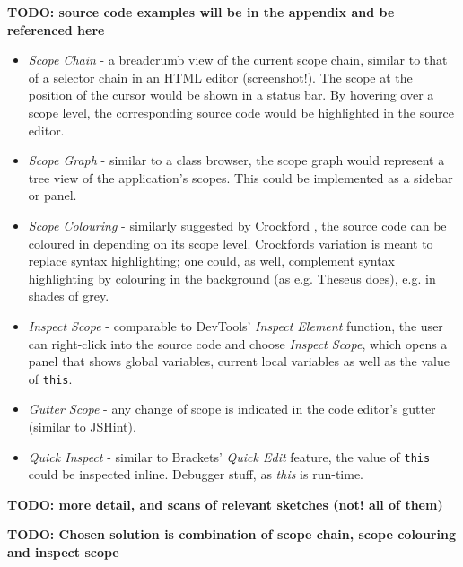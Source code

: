\textbf{TODO: source code examples will be in the appendix and be
referenced here}

\begin{itemize}
\itemsep1pt\parskip0pt
\item
  \emph{Scope Chain} - a breadcrumb view of the current scope chain,
  similar to that of a selector chain in an HTML editor (screenshot!).
  The scope at the position of the cursor would be shown in a status
  bar. By hovering over a scope level, the corresponding source code
  would be highlighted in the source editor.
\item
  \emph{Scope Graph} - similar to a class browser, the scope graph would
  represent a tree view of the application’s scopes. This could be
  implemented as a sidebar or panel.
\item
  \emph{Scope Colouring} - similarly suggested by Crockford
  \citeyear{crockford}, the source code can be coloured in depending on
  its scope level. Crockfords variation is meant to replace syntax
  highlighting; one could, as well, complement syntax highlighting by
  colouring in the background (as e.g. Theseus does), e.g. in shades of
  grey.
\item
  \emph{Inspect Scope} - comparable to DevTools’ \emph{Inspect Element}
  function, the user can right-click into the source code and choose
  \emph{Inspect Scope}, which opens a panel that shows global variables,
  current local variables as well as the value of \texttt{this}.
\item
  \emph{Gutter Scope} - any change of scope is indicated in the code
  editor’s gutter (similar to JSHint).
\item
  \emph{Quick Inspect} - similar to Brackets’ \emph{Quick Edit} feature,
  the value of \texttt{this} could be inspected inline. Debugger stuff,
  as \emph{this} is run-time.
\end{itemize}

\textbf{TODO: more detail, and scans of relevant sketches (not! all of
them)}

\textbf{TODO: Chosen solution is combination of scope chain, scope
colouring and inspect scope}
